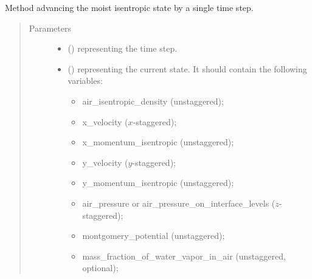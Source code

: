 \documentclass[letterpaper,10pt,english]{sphinxmanual}
\begin{document}
\begin{fulllineitems}
\begin{fulllineitems}
\begin{quote}
\begin{description}
\end{description}\end{quote}

\end{fulllineitems}


\begin{fulllineitems}
\label{\detokenize{api:tasmania.dycore.dycore_isentropic.DynamicalCoreIsentropic._step_moist}}
Method advancing the moist isentropic state by a single time step.
\begin{quote}\begin{description}
\item[{Parameters}] \leavevmode\begin{itemize}
\item {} 
 () \textendash{}  representing the time step.

\item {} 
 () \textendash{} 
{\hyperref[\detokenize{api:tasmania.storages.state_isentropic.StateIsentropic}]{}} representing the current state.
It should contain the following variables:
\begin{itemize}
\item {} 
air\_isentropic\_density (unstaggered);

\item {} 
x\_velocity (\(x\)-staggered);

\item {} 
x\_momentum\_isentropic (unstaggered);

\item {} 
y\_velocity (\(y\)-staggered);

\item {} 
y\_momentum\_isentropic (unstaggered);

\item {} 
air\_pressure or air\_pressure\_on\_interface\_levels (\(z\)-staggered);

\item {} 
montgomery\_potential (unstaggered);

\item {} 
mass\_fraction\_of\_water\_vapor\_in\_air (unstaggered, optional);


\end{itemize}
\end{itemize}
\end{description}
\end{quote}
\end{fulllineitems}
\end{fulllineitems}
\end{document}
